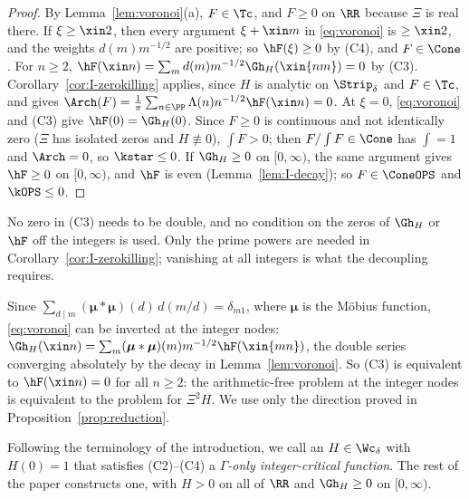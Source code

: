 \begin{proof}
By Lemma~\ref{lem:voronoi}(a), $F\in\Tc$, and $F\ge0$ on $\RR$ because $\Xi$ is real there. If $\xi\ge\xin2$, then every argument $\xi+\xin m$
in \eqref{eq:voronoi} is $\ge\xin2$, and the weights $d(m)m^{-1/2}$ are positive; so $\hF(\xi)\ge0$ by (C4), and $F\in\Cone$. For $n\ge2$,
$\hF(\xin n)=\sum_md(m)m^{-1/2}\Gh_H(\xin{nm})=0$ by (C3). Corollary~\ref{cor:I-zerokilling} applies, since $H$ is analytic on $\Strip_\delta$ and
$F\in\Tc$, and gives $\Arch(F)=\frac1\pi\sum_{n\in\PP}\Lambda(n)n^{-1/2}\hF(\xin n)=0$. At $\xi=0$, \eqref{eq:voronoi} and (C3) give
$\hF(0)=\Gh_H(0)$. Since $F\ge0$ is continuous and not identically zero ($\Xi$ has isolated zeros and $H\not\equiv0$), $\int F>0$; then
$F/\int F\in\Cone$ has $\int=1$ and $\Arch=0$, so $\kstar\le0$. If $\Gh_H\ge0$ on $[0,\infty)$, the same argument gives $\hF\ge0$ on
$[0,\infty)$, and $\hF$ is even (Lemma~\ref{lem:I-decay}); so $F\in\ConeOPS$ and $\kOPS\le0$.
\end{proof}

No zero in (C3) needs to be double, and no condition on the zeros of $\Gh_H$ or $\hF$ off the integers is used. Only the prime powers are
needed in Corollary~\ref{cor:I-zerokilling}; vanishing at all integers is what the decoupling requires.

\begin{remark}\label{rem:mobius}
Since $\sum_{d\mid m}(\boldsymbol\mu*\boldsymbol\mu)(d)\,d(m/d)=\delta_{m1}$, where $\boldsymbol\mu$ is the M\"obius function, \eqref{eq:voronoi}
can be inverted at the integer nodes: $\Gh_H(\xin n)=\sum_m(\boldsymbol\mu*\boldsymbol\mu)(m)m^{-1/2}\hF(\xin{mn})$, the double series converging
absolutely by the decay in Lemma~\ref{lem:voronoi}. So (C3) is equivalent to $\hF(\xin n)=0$ for all $n\ge2$: the arithmetic-free problem at the
integer nodes is equivalent to the problem for $\Xi^2H$. We use only the direction proved in Proposition~\ref{prop:reduction}.
\end{remark}

Following the terminology of the introduction, we call an $H\in\Wc_\delta$ with $H(0)=1$ that satisfies (C2)--(C4) a \emph{$\Gamma$-only
integer-critical function}. The rest of the paper constructs one, with $H>0$ on all of $\RR$ and $\Gh_H\ge0$ on $[0,\infty)$.
